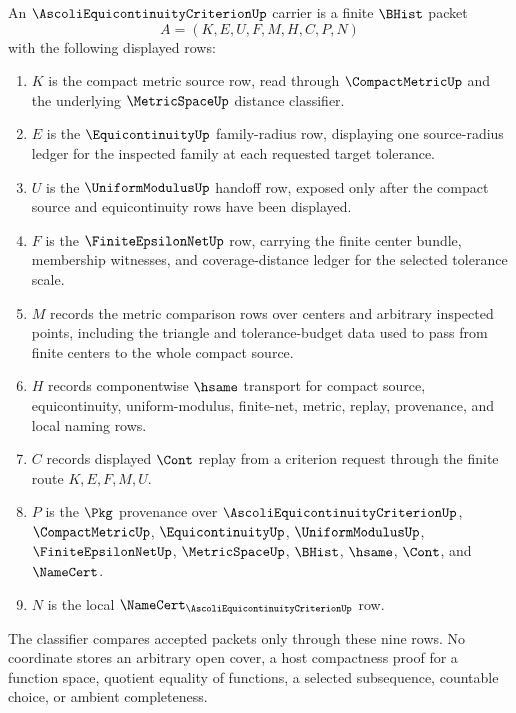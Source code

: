 \begin{definition}
\label{def:ascoli-equicontinuity-criterion-carrier}
An $\AscoliEquicontinuityCriterionUp$ carrier is a finite $\BHist$ packet
$$
A=(K,E,U,F,M,H,C,P,N)
$$
with the following displayed rows:
\begin{enumerate}
\item $K$ is the compact metric source row, read through $\CompactMetricUp$ and the underlying $\MetricSpaceUp$ distance classifier.
\item $E$ is the $\EquicontinuityUp$ family-radius row, displaying one source-radius ledger for the inspected family at each requested target tolerance.
\item $U$ is the $\UniformModulusUp$ handoff row, exposed only after the compact source and equicontinuity rows have been displayed.
\item $F$ is the $\FiniteEpsilonNetUp$ row, carrying the finite center bundle, membership witnesses, and coverage-distance ledger for the selected tolerance scale.
\item $M$ records the metric comparison rows over centers and arbitrary inspected points, including the triangle and tolerance-budget data used to pass from finite centers to the whole compact source.
\item $H$ records componentwise $\hsame$ transport for compact source, equicontinuity, uniform-modulus, finite-net, metric, replay, provenance, and local naming rows.
\item $C$ records displayed $\Cont$ replay from a criterion request through the finite route $K,E,F,M,U$.
\item $P$ is the $\Pkg$ provenance over $\AscoliEquicontinuityCriterionUp$, $\CompactMetricUp$, $\EquicontinuityUp$, $\UniformModulusUp$, $\FiniteEpsilonNetUp$, $\MetricSpaceUp$, $\BHist$, $\hsame$, $\Cont$, and $\NameCert$.
\item $N$ is the local $\NameCert_{\AscoliEquicontinuityCriterionUp}$ row.
\end{enumerate}
The classifier compares accepted packets only through these nine rows. No coordinate stores an arbitrary open cover, a host compactness proof for a function space, quotient equality of functions, a selected subsequence, countable choice, or ambient completeness.
\end{definition}

